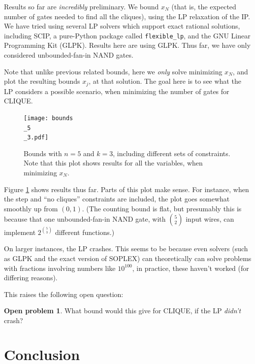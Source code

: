 \documentclass[12pt]{article}
\theoremstyle{definition}
\newtheorem{prob}{Open problem}[section]
\begin{document}
Results so far are {\em incredibly} preliminary. We bound $x_N$
(that is, the expected number of gates needed to find all the cliques),
using the LP relaxation of the IP. We have tried using several
LP solvers which support exact rational solutions,
including SCIP, a pure-Python package called {\tt flexible\_lp},
and the GNU Linear Programming Kit (GLPK). Results here are
using GLPK. Thus far, we have only considered unbounded-fan-in
NAND gates.

Note that unlike previous related bounds, here we {\em only} solve minimizing
$x_N$, and plot the resulting bounds $x_j$, at that solution. The
goal here is to see what the LP considers a possible scenario, when
minimizing the number of gates for CLIQUE.

\begin{figure}

\centering

\texttt{[image: bounds\\\_5\\\_3.pdf]}

\caption{
Bounds with $n=5$ and $k=3$, including different sets of constraints.
Note that this plot shows results for all the variables, when
minimizing $x_N$.
}
\label{fig:bounds0}

\end{figure}

Figure \ref{fig:bounds0} shows results thus far.
Parts of this plot make sense. For instance, when the
step and ``no cliques'' constraints are included, the
plot goes somewhat smoothly up from $(0,1)$. (The counting
bound is flat, but presumably this is because
that one unbounded-fan-in NAND gate, with ${5 \choose 2}$
input wires, can implement $2^{5 \choose 3}$ different
functions.)

On larger instances, the LP crashes. This seems to be because even
solvers (such as GLPK and the exact version of SOPLEX) can
theoretically can solve problems with fractions involving
numbers like $10^{100}$, in practice, these haven't worked
(for differing reasons).

This raises the following open question:

\begin{prob}
What bound would this give for CLIQUE, if the LP {\em didn't} crash?
\end{prob}

\section{Conclusion}
\end{document}
